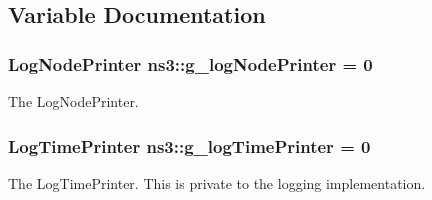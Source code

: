 \subsection{Variable Documentation}
\subsubsection[{\texorpdfstring{g\+\_\+log\+Node\+Printer}{g_logNodePrinter}}]{\setlength{\rightskip}{0pt plus 5cm}Log\+Node\+Printer ns3\+::g\+\_\+log\+Node\+Printer = 0\hspace{0.3cm}{\ttfamily [static]}}\hypertarget{group__logging_ga7fb552b12a9e9494bc92193053396bb8}{}\label{group__logging_ga7fb552b12a9e9494bc92193053396bb8}
The Log\+Node\+Printer. 
\subsubsection[{\texorpdfstring{g\+\_\+log\+Time\+Printer}{g_logTimePrinter}}]{\setlength{\rightskip}{0pt plus 5cm}Log\+Time\+Printer ns3\+::g\+\_\+log\+Time\+Printer = 0\hspace{0.3cm}{\ttfamily [static]}}\hypertarget{group__logging_ga6bc890b9ae1db6402550a830c0ced500}{}\label{group__logging_ga6bc890b9ae1db6402550a830c0ced500}
The Log\+Time\+Printer. This is private to the logging implementation. 